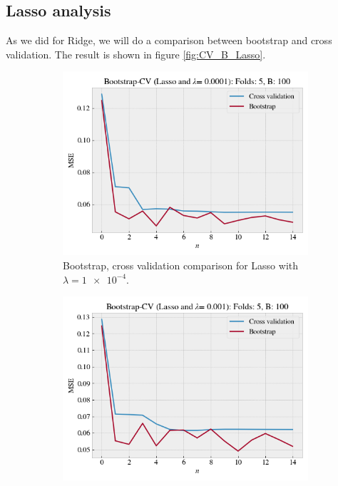 \documentclass[norsk,a4paper,12pt]{scrartcl}
\begin{document}
\subsection{Lasso analysis}
As we did for Ridge, we will do a comparison between bootstrap and cross validation. The result is shown in figure \ref{fig:CV_B_Lasso}.
\begin{figure}[H]
     \centering
     \begin{subfigure}[b]{0.49\textwidth}
         \centering
         \includegraphics[width=\textwidth]{figures/CV_B_Lasso_0001.png}
         \caption{Bootstrap, cross validation comparison for Lasso with $\lambda = \num{1e-4}$.}
        \label{fig:CV_B_Lasso0001}
     \end{subfigure}
    \hfill
     \begin{subfigure}[b]{0.49\textwidth}
         \centering
         \includegraphics[width=\textwidth]{figures/CV_B_Lasso_001.png}

\end{subfigure}
\end{figure}
\end{document}
